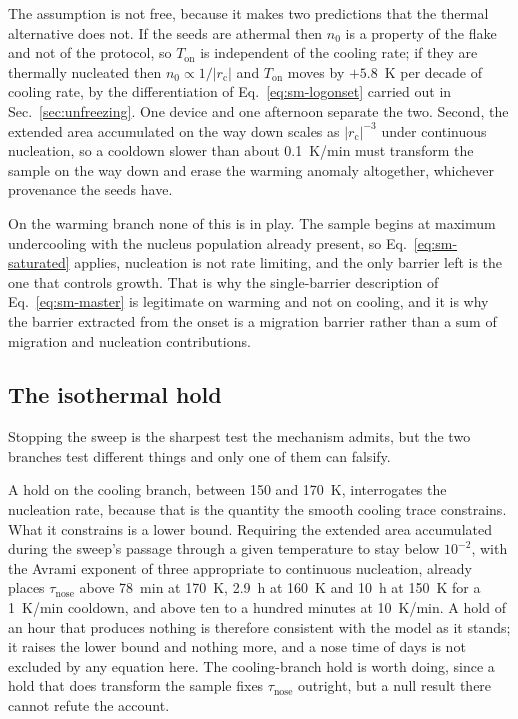 \documentclass[reprint,twocolumn,prb,amsmath,amssymb,superscriptaddress,floatfix]{revtex4-2}
\newcommand{\Ton}{T_{\mathrm{on}}}
\begin{document}
The assumption is not free, because it makes two predictions that the thermal alternative does
not. If the seeds are athermal then $n_{0}$ is a property of the flake and not of the protocol,
so $\Ton$ is independent of the cooling rate; if they are thermally nucleated then
$n_{0}\propto1/|r_{\mathrm{c}}|$ and $\Ton$ moves by $+5.8$~K per decade of cooling rate, by the
differentiation of Eq.~\eqref{eq:sm-logonset} carried out in Sec.~\ref{sec:unfreezing}. One
device and one afternoon separate the two.
Second, the extended area accumulated on the way down scales as $|r_{\mathrm{c}}|^{-3}$ under
continuous nucleation, so a cooldown slower than about 0.1~K/min must transform the sample on
the way down and erase the warming anomaly altogether, whichever provenance the seeds have.

On the warming branch none of this is in play. The sample begins at maximum undercooling with
the nucleus population already present, so Eq.~\eqref{eq:sm-saturated} applies, nucleation is
not rate limiting, and the only barrier left is the one that controls growth. That is why the
single-barrier description of Eq.~\eqref{eq:sm-master} is legitimate on warming and not on
cooling, and it is why the barrier extracted from the onset is a migration barrier rather than
a sum of migration and nucleation contributions.

\subsection{The isothermal hold}

Stopping the sweep is the sharpest test the mechanism admits, but the two branches test
different things and only one of them can falsify.

A hold on the cooling branch, between 150 and 170~K, interrogates the nucleation rate, because
that is the quantity the smooth cooling trace constrains. What it constrains is a lower bound.
Requiring the extended area accumulated during the sweep's passage through a given temperature
to stay below $10^{-2}$, with the Avrami exponent of three appropriate to continuous
nucleation, already places $\tau_{\mathrm{nose}}$ above 78~min at 170~K, 2.9~h at 160~K and
10~h at 150~K for a 1~K/min cooldown, and above ten to a hundred minutes at 10~K/min. A hold of
an hour that produces nothing is therefore consistent with the model as it stands; it raises the
lower bound and nothing more, and a nose time of days is not excluded by any equation here. The
cooling-branch hold is worth doing, since a hold that does transform the sample fixes
$\tau_{\mathrm{nose}}$ outright, but a null result there cannot refute the account.
\end{document}
